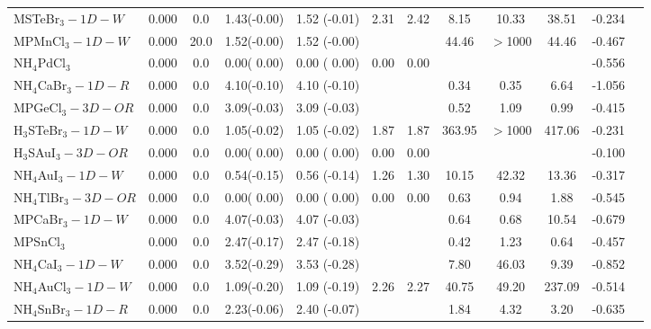 \begin{table*}
\begin{tabular*}{0.98\textwidth}{@{\extracolsep{\fill}}l c c c c c c c c c c c}
     MSTeBr$_3-1D-W$&      0.000&        0.0&       1.43(-0.00)&            1.52  (-0.01)&       2.31&            2.42&            8.15&           10.33&           38.51&     -0.234\\
     MPMnCl$_3-1D-W$&      0.000&       20.0&       1.52(-0.00)&            1.52  (-0.00)&           &                &           44.46&         $>$1000&           44.46&     -0.467\\
      NH$_4$PdCl$_3$&      0.000&        0.0&       0.00( 0.00)&            0.00  ( 0.00)&       0.00&            0.00&                &                &                &     -0.556\\
 NH$_4$CaBr$_3-1D-R$&      0.000&        0.0&       4.10(-0.10)&            4.10  (-0.10)&           &                &            0.34&            0.35&            6.64&     -1.056\\
    MPGeCl$_3-3D-OR$&      0.000&        0.0&       3.09(-0.03)&            3.09  (-0.03)&           &                &            0.52&            1.09&            0.99&     -0.415\\
 H$_3$STeBr$_3-1D-W$&      0.000&        0.0&       1.05(-0.02)&            1.05  (-0.02)&       1.87&            1.87&          363.95&         $>$1000&          417.06&     -0.231\\
 H$_3$SAuI$_3-3D-OR$&      0.000&        0.0&       0.00( 0.00)&            0.00  ( 0.00)&       0.00&            0.00&                &                &                &     -0.100\\
  NH$_4$AuI$_3-1D-W$&      0.000&        0.0&       0.54(-0.15)&            0.56  (-0.14)&       1.26&            1.30&           10.15&           42.32&           13.36&     -0.317\\
NH$_4$TlBr$_3-3D-OR$&      0.000&        0.0&       0.00( 0.00)&            0.00  ( 0.00)&       0.00&            0.00&            0.63&            0.94&            1.88&     -0.545\\
     MPCaBr$_3-1D-W$&      0.000&        0.0&       4.07(-0.03)&            4.07  (-0.03)&           &                &            0.64&            0.68&           10.54&     -0.679\\
          MPSnCl$_3$&      0.000&        0.0&       2.47(-0.17)&            2.47  (-0.18)&           &                &            0.42&            1.23&            0.64&     -0.457\\
  NH$_4$CaI$_3-1D-W$&      0.000&        0.0&       3.52(-0.29)&            3.53  (-0.28)&           &                &            7.80&           46.03&            9.39&     -0.852\\
 NH$_4$AuCl$_3-1D-W$&      0.000&        0.0&       1.09(-0.20)&            1.09  (-0.19)&       2.26&            2.27&           40.75&           49.20&          237.09&     -0.514\\
 NH$_4$SnBr$_3-1D-R$&      0.000&        0.0&       2.23(-0.06)&            2.40  (-0.07)&           &                &            1.84&            4.32&            3.20&     -0.635\\
   \hline 
    \end{tabular*}
 \end{table*}
